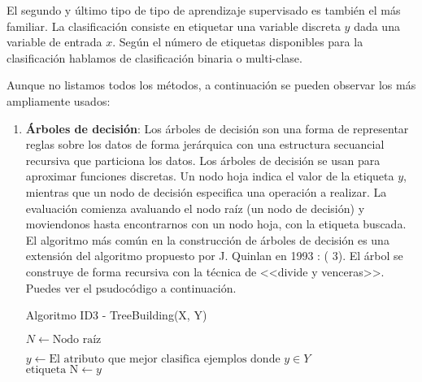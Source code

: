 El segundo y último tipo de tipo de aprendizaje supervisado es también el más familiar. La clasificación consiste en etiquetar una variable discreta $y$ dada una variable de entrada $x$. Según el número de etiquetas disponibles para la clasificación hablamos de clasificación binaria o multi-clase.

Aunque no listamos todos los métodos, a continuación se pueden observar los más ampliamente usados:

\begin{enumerate}
  \item \textbf{Árboles de decisión}: Los árboles de decisión son una forma de representar reglas sobre los datos de forma jerárquica con una estructura secuancial recursiva que particiona los datos. Los árboles de decisión se usan para aproximar funciones discretas. Un nodo hoja indica el valor de la etiqueta $y$, mientras que un nodo de decisión especifica una operación a realizar. La evaluación comienza avaluando el nodo raíz (un nodo de decisión) y moviendonos hasta encontrarnos con un nodo hoja, con la etiqueta buscada. El algoritmo más común en la construcción de árboles de decisión es una extensión del algoritmo propuesto por J. Quinlan en 1993 \et {}:  ( 3). El árbol se construye  de forma recursiva con la técnica de <<divide y venceras>>. Puedes ver el psudocódigo a continuación.

        \begin{algorithm}[H]
          \caption{Algoritmo ID3 - TreeBuilding(X, Y)}

          \BlankLine

          \BlankLine

          $N \gets \text{Nodo raíz}$\\

          \BlankLine

          \BlankLine
          $y \gets \text{El atributo que mejor clasifica ejemplos donde } y \in Y$\\
          $\text{etiqueta N} \gets y$\\


\end{algorithm}
\end{enumerate}

